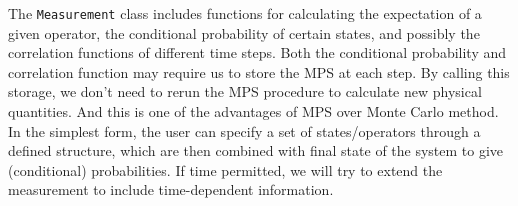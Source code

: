 
The \texttt{Measurement} class includes functions for calculating the expectation of a given operator, the conditional probability of certain states, and possibly the correlation functions of different time steps. Both the conditional probability and correlation function may require us to store the MPS at each step. By calling this storage, we don't need to rerun the MPS procedure to calculate new physical quantities. And this is one of the advantages of MPS over Monte Carlo method. In the simplest form, the user can specify a set of states/operators through a defined structure, which are then combined with final state of the system to give (conditional) probabilities. If time permitted, we will try to extend the measurement to include time-dependent information.
